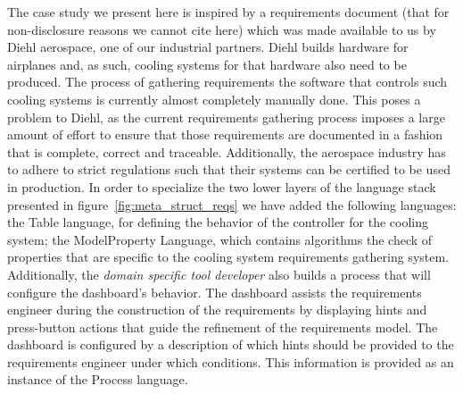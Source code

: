 The case study we present here is inspired by a requirements document (that for
non-disclosure reasons we cannot cite here) which was made available to us by
Diehl aerospace, one of our industrial partners. Diehl builds hardware for
airplanes and, as such, cooling systems for that hardware also need to be
produced. The process of gathering requirements the software that controls such
cooling systems is currently almost completely manually done. This poses a
problem to Diehl, as the current requirements gathering process imposes a large
amount of effort to ensure that those requirements are documented in a fashion
that is complete, correct and traceable. Additionally, the aerospace industry
has to adhere to strict regulations such that their systems can be certified to
be used in production.
In order to specialize the two lower layers of the language stack presented in
figure~\ref{fig:meta_struct_reqs} we have added the following languages: the
\textsf{Table} language, for defining the behavior of the controller for the
cooling system; the \textsf{ModelProperty} Language, which contains algorithms
the check of properties that are specific to the cooling system requirements
gathering system. Additionally, the \emph{domain specific tool developer} also
builds a process that will configure the dashboard's behavior. The dashboard assists the
requirements engineer during the construction of the requirements by displaying
hints and press-button actions that guide the refinement of the requirements
model. The dashboard is configured by a description of which hints should be
provided to the requirements engineer under which conditions. This information
is provided as an instance of the \textsf{Process} language.

